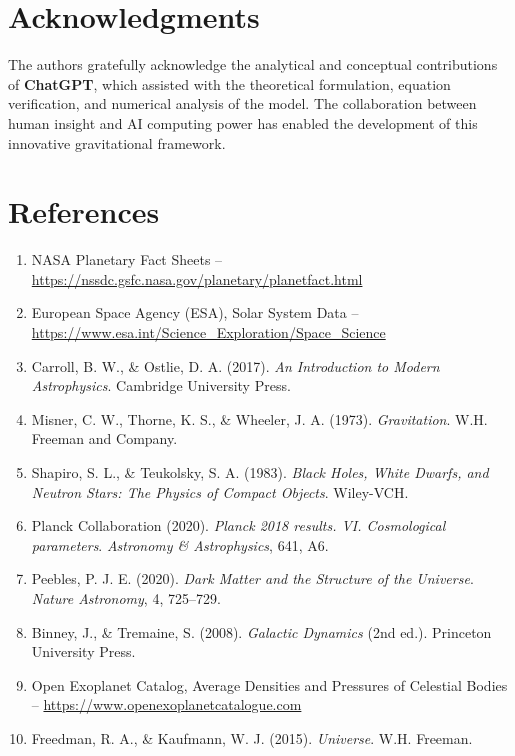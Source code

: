 \documentclass[12pt,a4paper]{article}
\begin{document}
\section{Acknowledgments}
The authors gratefully acknowledge the analytical and conceptual contributions of \textbf{ChatGPT}, which assisted with the theoretical formulation, equation verification, and numerical analysis of the model. The collaboration between human insight and AI computing power has enabled the development of this innovative gravitational framework.

\section{References}
\begin{enumerate}
    \item NASA Planetary Fact Sheets – \url{https://nssdc.gsfc.nasa.gov/planetary/planetfact.html}
    \item European Space Agency (ESA), Solar System Data – \url{https://www.esa.int/Science_Exploration/Space_Science}
    \item Carroll, B. W., \& Ostlie, D. A. (2017). \textit{An Introduction to Modern Astrophysics}. Cambridge University Press.
    \item Misner, C. W., Thorne, K. S., \& Wheeler, J. A. (1973). \textit{Gravitation}. W.H. Freeman and Company.
    \item Shapiro, S. L., \& Teukolsky, S. A. (1983). \textit{Black Holes, White Dwarfs, and Neutron Stars: The Physics of Compact Objects}. Wiley-VCH.
    \item Planck Collaboration (2020). \textit{Planck 2018 results. VI. Cosmological parameters}. \textit{Astronomy \& Astrophysics}, 641, A6.
    \item Peebles, P. J. E. (2020). \textit{Dark Matter and the Structure of the Universe}. \textit{Nature Astronomy}, 4, 725–729.
    \item Binney, J., \& Tremaine, S. (2008). \textit{Galactic Dynamics} (2nd ed.). Princeton University Press.
    \item Open Exoplanet Catalog, Average Densities and Pressures of Celestial Bodies – \url{https://www.openexoplanetcatalogue.com}
    \item Freedman, R. A., \& Kaufmann, W. J. (2015). \textit{Universe}. W.H. Freeman.
\end{enumerate}
\end{document}
